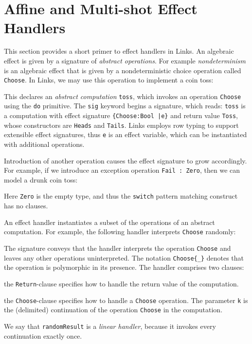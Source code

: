 \documentclass[preprint,numbers]{sigplanconf}
\begin{document}
\section{Affine and Multi-shot Effect Handlers}
This section provides a short primer to effect handlers in Links. An
algebraic effect is given by a signature of \emph{abstract
  operations}. For example \emph{nondeterminism} is an algebraic
effect that is given by a nondeterministic choice operation called
\lstinline$Choose$. In Links, we may use this operation to implement a
coin toss:
%

%
This declares an \emph{abstract computation} \lstinline$toss$, which
invokes an operation \lstinline$Choose$ using the \lstinline$do$
primitive.  The \lstinline$sig$ keyword begins a signature, which
reads: \lstinline$toss$ is a computation with effect signature
\lstinline${Choose:Bool |e}$ and return value \lstinline$Toss$, whose
constructors are \lstinline$Heads$ and \lstinline$Tails$.  Links
employs row typing to support extensible effect signatures, thus
\lstinline$e$ is an effect variable, which can be instantiated with
additional operations.

Introduction of another operation causes the effect signature to grow
accordingly. For example, if we introduce an exception operation
\lstinline$Fail : Zero$, then we can model a drunk coin toss:
%

%
Here \lstinline$Zero$ is the empty type, and thus the
\lstinline$switch$ pattern matching construct has no clauses.

An effect handler instantiates a subset of the operations of an
abstract computation. For example, the following handler interprets
\lstinline$Choose$ randomly:
%

%
The signature conveys that the handler interprets the operation
\lstinline$Choose$ and leaves any other operations uninterpreted. The
notation \lstinline$Choose{_}$ denotes that the operation is
polymorphic in its presence.  The handler comprises two clauses:
\begin{enumerate*}[label={\roman*)}]
\item the \lstinline$Return$-clause specifies how to handle the return
  value of the computation.
\item the \lstinline$Choose$-clause specifies how to handle a
  \lstinline$Choose$ operation. The parameter \lstinline$k$ is the
  (delimited) continuation of the operation \lstinline$Choose$ in the
  computation.
\end{enumerate*}
We say that \lstinline$randomResult$ is a \emph{linear handler}, because
it invokes every continuation exactly once.
\end{document}
